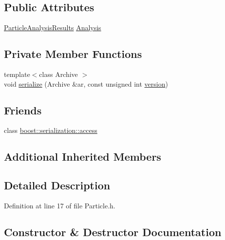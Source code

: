 \subsection*{Public Attributes}
\begin{DoxyCompactItemize}
\item 
\hyperlink{class_soil_analyzer_1_1_particle_analysis_results}{Particle\+Analysis\+Results} \hyperlink{class_soil_analyzer_1_1_particle_a4df8d4d8fb130bce05fef5d4601ef89e}{Analysis}
\end{DoxyCompactItemize}
\subsection*{Private Member Functions}
\begin{DoxyCompactItemize}
\item 
{\footnotesize template$<$class Archive $>$ }\\void \hyperlink{class_soil_analyzer_1_1_particle_adf8333262eab916769156f8c324e5a28}{serialize} (Archive \&ar, const unsigned int \hyperlink{class_soil_analyzer_1_1_soil_ac32132912c73338edf60b5cd6de4feb8}{version})
\end{DoxyCompactItemize}
\subsection*{Friends}
\begin{DoxyCompactItemize}
\item 
class \hyperlink{class_soil_analyzer_1_1_particle_ac98d07dd8f7b70e16ccb9a01abf56b9c}{boost\+::serialization\+::access}
\end{DoxyCompactItemize}
\subsection*{Additional Inherited Members}


\subsection{Detailed Description}


Definition at line 17 of file Particle.\+h.



\subsection{Constructor \& Destructor Documentation}
\hypertarget{class_soil_analyzer_1_1_particle_ac01adbc5a4a30350985c0076da52e7da}{}
